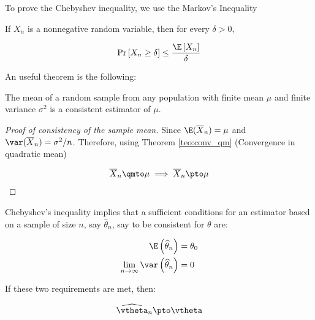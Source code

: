 To prove the Chebyshev inequality, we use the Markov's Inequality

\begin{definition}\label{definition:chebyshev_ineq}
	 If $X_n$ is a nonnegative random variable, then for every $\delta > 0$,
	 
	 \begin{equation*}
	 \Pr\left[X_n \geq \delta \right]\leq \frac{\E\left[X_n\right]}{\delta}
	 \end{equation*}
\end{definition}


An useful theorem is the following:

\begin{theorem}\label{teo:consistency_sample_mean}
The mean of a random sample from any population with finite mean $\mu$ and finite variance $\sigma^2$ is a consistent estimator of $\mu$.
\end{theorem}

\begin{proof}[Proof of consistency of the sample mean]
Since $\E(\overline{X}_n) = \mu$ and $\var(\overline{X}_n) = \sigma^2/n$. Therefore, using Theorem \ref{teo:conv_qm} (Convergence in quadratic mean)

\begin{equation*}
\overline{X}_n \qmto \mu \implies \overline{X}_n \pto \mu
\end{equation*}
\end{proof}

\begin{theorem}\label{teo:chebyshev}
Chebyshev's inequality implies that a sufficient conditions for an estimator based on a sample of size $n$, say $\widehat{\theta}_n$, say to be consistent for $\theta$ are:

\begin{equation*}
  \begin{aligned}
    \E\left(\widehat{\theta}_n\right) & = \theta_0 \\
    \lim_{n \to \infty} \var\left(\widehat{\theta}_n\right)& = 0
  \end{aligned}
\end{equation*}

If these two requirements are met, then:

\begin{equation*}
\widehat{\vtheta}_n\pto \vtheta
\end{equation*}
\end{theorem}

